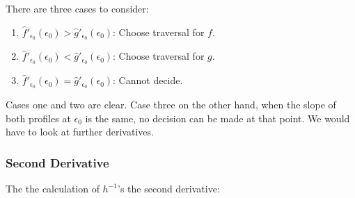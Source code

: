 There are three cases to consider:

\begin{enumerate}
	\item $\hat{f}'_{\epsilon_0}(\epsilon_0) > \hat{g}'_{\epsilon_0}(\epsilon_0)$: Choose traversal for $f$.
	\item $\hat{f}'_{\epsilon_0}(\epsilon_0) < \hat{g}'_{\epsilon_0}(\epsilon_0)$: Choose traversal for $g$.
	\item $\hat{f}'_{\epsilon_0}(\epsilon_0) = \hat{g}'_{\epsilon_0}(\epsilon_0)$: Cannot decide.
\end{enumerate}

Cases one and two are clear. Case three on the other hand, when the slope of both profiles at $\epsilon_0$ is the same, no decision can be made at that point. We would have to look at further derivatives.


\subsubsection{Second Derivative}

The the calculation of $h^{-1}$'s the second derivative:

